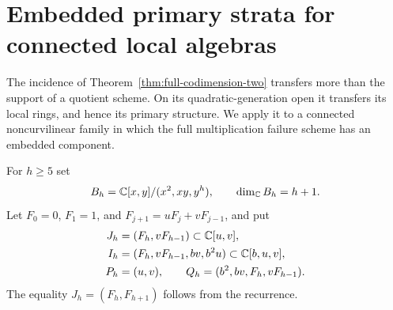 \section{Embedded primary strata for connected local algebras}
\label{sec:embedded-multigenerator}
The incidence of Theorem~\ref{thm:full-codimension-two} transfers
more than the support of a quotient scheme. On its quadratic-generation
open it transfers its local rings, and hence its primary structure.
We apply it to a connected noncurvilinear family in which the full
multiplication failure scheme has an embedded component.

For $h\ge5$ set
\begin{equation}\label{eq:fork-algebra}
 B_h=\mathbb C[x,y]/(x^2,xy,y^h),\qquad \dim_\mathbb C B_h=h+1.
\end{equation}
Let $F_0=0$, $F_1=1$, and $F_{j+1}=uF_j+vF_{j-1}$, and put
\begin{equation}\label{eq:fork-ideals}
 \begin{split}
 J_h&=(F_h,vF_{h-1})\subset\mathbb C[u,v],\\
 I_h&=(F_h,vF_{h-1},bv,b^2u)\subset\mathbb C[b,u,v],\\
 P_h&=(u,v),\qquad Q_h=(b^2,bv,F_h,vF_{h-1}).
 \end{split}
\end{equation}
The equality $J_h=(F_h,F_{h+1})$ follows from the recurrence.

